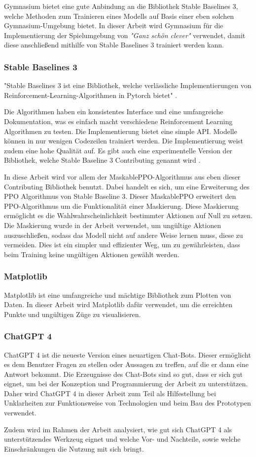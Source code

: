 Gymnasium bietet eine gute Anbindung an die Bibliothek Stable Baselines 3, welche Methoden zum Trainieren eines Modells auf Basis einer eben solchen Gymnasium-Umgebung bietet. In dieser Arbeit wird Gymnasium für die Implementierung der Spielumgebung von \textit{"Ganz schön clever"} verwendet, damit diese anschließend mithilfe von Stable Baselines 3 trainiert werden kann.
\subsubsection{Stable Baselines 3}
"Stable Baselines 3 ist eine Bibliothek, welche verlässliche Implementierungen von Reinforcement-Learning-Algorithmen in Pytorch bietet" \cite[Seite 1]{noauthor_stable-baselines3_nodate}. 

Die Algorithmen haben ein konsistentes Interface und eine umfangreiche Dokumentation, was es einfach macht verschiedene Reinforcement Learning Algorithmen zu testen. Die Implementierung bietet eine simple API. Modelle können in nur wenigen Codezeilen trainiert werden. Die Implementierung weist zudem eine hohe Qualität auf. Es gibt auch eine experimentelle Version der Bibliothek, welche Stable Baseline 3 Contributing genannt wird \cite[Seite 1-3]{noauthor_stable-baselines3_nodate}.

In diese Arbeit wird vor allem der MaskablePPO-Algorithmus aus eben dieser Contributing Bibliothek benutzt. Dabei handelt es sich, um eine Erweiterung des PPO Algorithmus von Stable Baseline 3. Dieser MaskablePPO erweitert den PPO-Algorithmus um die Funktionalität einer Maskierung. Diese Maskierung ermöglicht es die Wahlwahrscheinlichkeit bestimmter Aktionen auf Null zu setzen. Die Maskierung wurde in der Arbeit verwendet, um ungültige Aktionen auszuschließen, sodass das Modell nicht auf andere Weise lernen muss, diese zu vermeiden. Dies ist ein simpler und effizienter Weg, um zu gewährleisten, dass beim Training keine ungültigen Aktionen gewählt werden.
\subsubsection{Matplotlib}
Matplotlib ist eine umfangreiche und mächtige Bibliothek zum Plotten von Daten. In dieser Arbeit wird Matplotlib dafür verwendet, um die erreichten Punkte und ungültigen Züge zu visualisieren.
\subsubsection{ChatGPT 4}
ChatGPT 4 ist die neueste Version eines neuartigen Chat-Bots. Dieser ermöglicht es dem Benutzer Fragen zu stellen oder Aussagen zu treffen, auf die er dann eine Antwort bekommt. Die Erzeugnisse des Chat-Bots sind so gut, dass er sich gut eignet, um bei der Konzeption und Programmierung der Arbeit zu unterstützen. Daher wird ChatGPT 4 in dieser Arbeit zum Teil als Hilfestellung bei Unklarheiten zur Funktionsweise von Technologien und beim Bau des Prototypen verwendet. 

Zudem wird im Rahmen der Arbeit analysiert, wie gut sich ChatGPT 4 als unterstützendes Werkzeug eignet und welche Vor- und Nachteile, sowie welche Einschränkungen die Nutzung mit sich bringt.